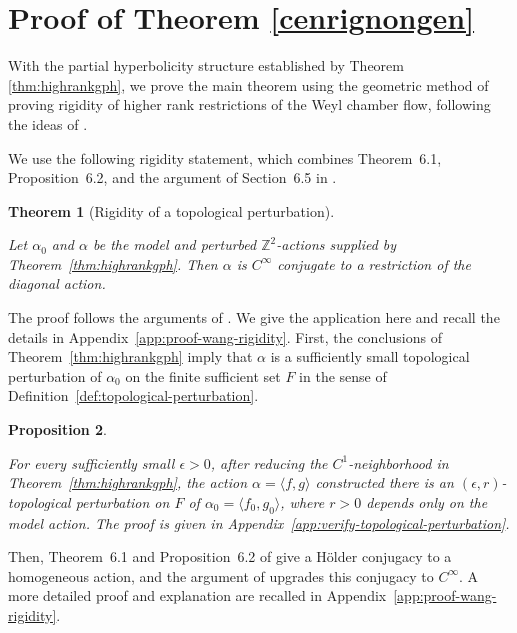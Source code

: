 \documentclass[11pt]{amsart}
\numberwithin{equation}{section}
\theoremstyle{plain}
\newtheorem{thm}{Theorem}[section]
\newtheorem{prop}[thm]{Proposition}
\begin{document}
\section{Proof of Theorem \ref{cenrignongen}}\label{sec:main-proof}

With the partial hyperbolicity structure established by Theorem \ref{thm:highrankgph}, we prove the main theorem using the geometric method of proving rigidity of higher rank restrictions of the Weyl chamber flow, following the ideas of \cite{DK,Vinhage,VinWang,Wang}. 


We use the following rigidity statement, which combines
Theorem~6.1, Proposition~6.2, and the argument of Section~6.5 in
\cite{Wang26}.


\begin{thm}[Rigidity of a topological perturbation]
\label{thm:wang-rigidity}

Let $\alpha_0$ and $\alpha$ be the model and perturbed
$\mathbb Z^2$-actions supplied by Theorem~\ref{thm:highrankgph}.
Then $\alpha$ is
$C^\infty$ conjugate to a restriction of the diagonal action.

\end{thm}

The proof follows the arguments of \cite{Wang26,VinWang}.  We
give the application here and recall the details in
Appendix~\ref{app:proof-wang-rigidity}.  First, the conclusions of
Theorem~\ref{thm:highrankgph} imply that $\alpha$ is a sufficiently
small topological perturbation of $\alpha_0$ on the finite sufficient
set $F$ in the sense of Definition~\ref{def:topological-perturbation}.

\begin{prop}\label{prop:alpha-topological}

For every sufficiently small $\epsilon>0$, after reducing the
$C^1$-neighborhood in Theorem~\ref{thm:highrankgph}, the action
$\alpha=\langle f,g\rangle$ constructed there is an
$(\epsilon,r)$-topological perturbation on $F$ of
$\alpha_0=\langle f_0,g_0\rangle$, where $r>0$ depends only on the
model action.  The proof is given in
Appendix~\ref{app:verify-topological-perturbation}.

\end{prop}

Then, Theorem~6.1 and Proposition~6.2 of \cite{Wang26} give a H\"older
conjugacy to a homogeneous action, and the argument of
\cite[Section~6.5]{Wang26} upgrades this conjugacy to $C^\infty$.
A more detailed proof and explanation are recalled in
Appendix~\ref{app:proof-wang-rigidity}.
\end{document}
